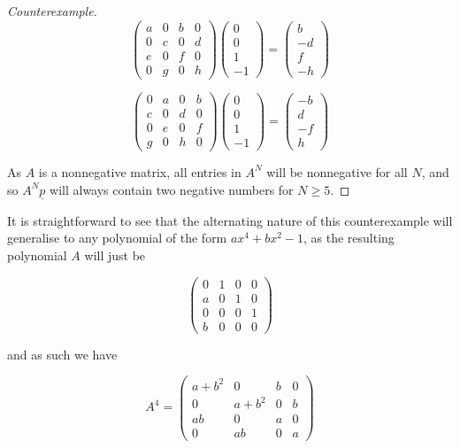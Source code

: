 \documentclass[
11pt, %
english, %
singlespacing, %
parskip, %
headsepline, %
]{amsart} %
\theoremstyle{definition}
\begin{document}
\begin{proof}[Counterexample]
$$
\begin{pmatrix}
a & 0 & b & 0 \\
0 & c & 0 & d \\
e & 0 & f & 0 \\
0 & g & 0 & h 
\end{pmatrix}
\begin{pmatrix} 0 \\ 0 \\ 1 \\ -1 \end{pmatrix}
=
\begin{pmatrix} b \\ -d \\ f \\ -h \end{pmatrix}  
$$

$$
\begin{pmatrix}
0 & a & 0 & b \\
c & 0 & d & 0 \\
0 & e & 0 & f \\
g & 0 & h & 0 
\end{pmatrix} 
\begin{pmatrix} 0 \\ 0 \\ 1 \\ -1 \end{pmatrix}
=
\begin{pmatrix} -b \\ d \\ -f \\ h \end{pmatrix}
$$
  
As $A$ is a nonnegative matrix, all entries in $A^N$ will be nonnegative for all $N$, and so $A^N \underline{p}$ will always contain two negative numbers for $N \geq 5$. 
\end{proof}

It is straightforward to see that the alternating nature of this counterexample will generalise to any polynomial of the form $ax^4+bx^2-1$, as the resulting polynomial $A$ will just be 

$$
\begin{pmatrix}
0 & 1 & 0 & 0 \\
a & 0 & 1 & 0 \\
0 & 0 & 0 & 1 \\
b & 0 & 0 & 0
\end{pmatrix}
$$

and as such we have

$$
A^4 = 
\begin{pmatrix}
a+b^2 & 0 & b & 0 \\
0 & a+b^2 & 0 & b \\
ab & 0 & a & 0 \\
0 & ab & 0 & a
\end{pmatrix}
$$
\end{document}
